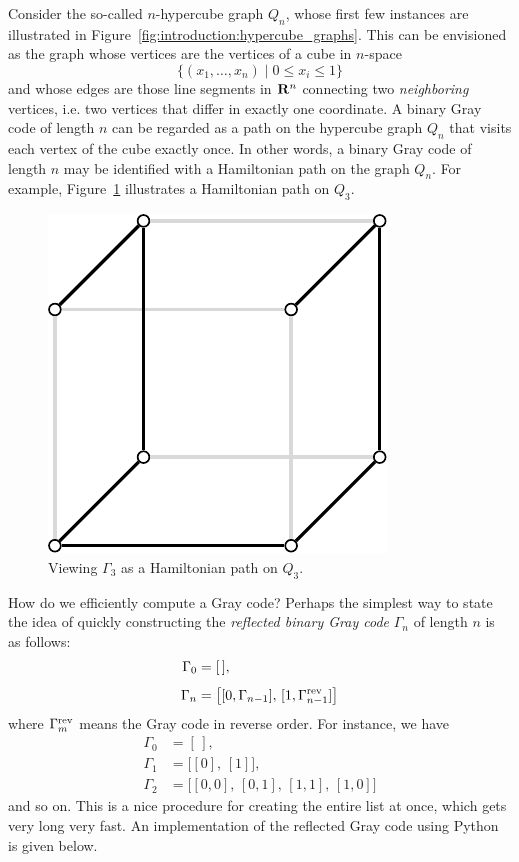 Consider the so-called $n$-hypercube graph
$Q_n$, whose first few instances are illustrated in
Figure~\ref{fig:introduction:hypercube_graphs}. This can be envisioned
as the graph whose vertices are the vertices of a cube in
$n$-space
\[
\{(x_1, \dots, x_n) \mid 0 \leq x_i \leq 1\}
\]
and whose edges are those line segments in $\mathbf{R}^n$ connecting two
\emph{neighboring} vertices, i.e. two vertices that differ in exactly
one coordinate. A binary Gray code of length
$n$ can be regarded as a
path on the hypercube graph $Q_n$ that visits
each vertex of the cube exactly once. In other words, a binary Gray
code of length $n$ may be identified with a
Hamiltonian path on the graph $Q_n$. For
example, Figure~\ref{fig:trees_forests:gray_code_cube} illustrates a
Hamiltonian path on $Q_3$.

\begin{figure}[!htbp]
\centering
{}
\includegraphics{image/trees-forests/gray-code-cube}
\caption{Viewing $\Gamma_3$ as a Hamiltonian path on $Q_3$.}
\label{fig:trees_forests:gray_code_cube}
\end{figure}

How do we efficiently compute a Gray code? Perhaps
the simplest way to state the idea of quickly constructing the
\emph{reflected binary Gray code}
$\Gamma_n$ of length $n$ is as follows:
\begin{align*}
\Gamma_0 &= [\,], \\[4pt]
\Gamma_{n} &= \big[[0, \Gamma_{n-1}],\, [1, \Gamma_{n-1}^{\rm rev}]\big]
\end{align*}
where $\Gamma_m^{\rm rev}$ means the Gray code in reverse order. For
instance, we have
\begin{align*}
\Gamma_0 &= [\,], \\[4pt]
\Gamma_1 &= \big[[0],\, [1]\big], \\[4pt]
\Gamma_2 &= \big[[0,0],\, [0,1],\, [1,1],\, [1,0]\big]
\end{align*}
and so on. This is a nice procedure for creating the entire list at
once, which gets very long very fast. An implementation of the
reflected Gray code using Python is given below.

